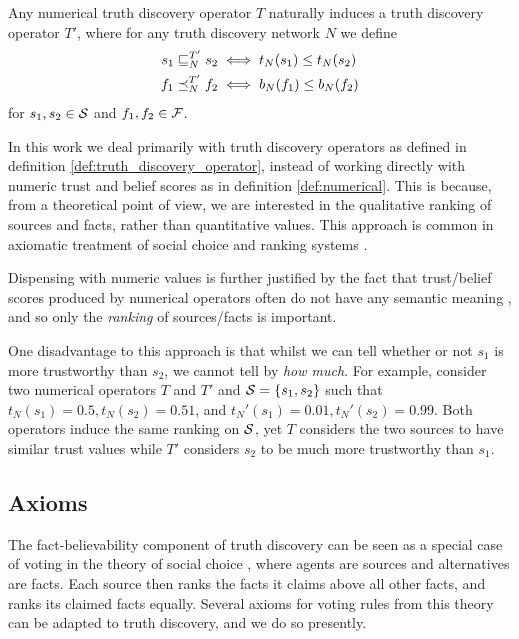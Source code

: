 \documentclass[../main.tex]{subfiles}
\begin{document}
\begin{remark}
    Any numerical truth discovery operator $T$ naturally induces a
    truth discovery operator $T'$, where for any truth discovery network $N$
    we define
    \begin{align*}
    s_1 \sle_N^{T'} s_2 & \iff t_N(s_1) \le t_N(s_2) \\
    f_1 \fle_N^{T'} f_2 & \iff b_N(f_1) \le b_N(f_2)
    \end{align*}
    for $s_1, s_2 \in \S$ and $f_1, f_2 \in \F$.
\end{remark}

In this work we deal primarily with truth discovery operators as defined in
definition \ref{def:truth_discovery_operator}, instead of working directly with
numeric trust and belief scores as in definition \ref{def:numerical}. This is
because, from a theoretical point of view, we are interested in the qualitative
ranking of sources and facts, rather than quantitative values. This approach is
common in axiomatic treatment of social choice and ranking systems
\cite{arrow,altman,altman_personalised}.

Dispensing with numeric values is further justified by the fact that
trust/belief scores produced by numerical operators often do not have any
semantic meaning \cite{pasternack}, and so only the \emph{ranking} of
sources/facts is important.

One disadvantage to this approach is that whilst we can tell whether or not
$s_1$ is more trustworthy than $s_2$, we cannot tell by \emph{how much}. For
example, consider two numerical operators $T$ and $T'$ and $\S=\{s_1, s_2\}$
such that $t_N(s_1)=0.5, t_N(s_2)=0.51$, and $t_N'(s_1)=0.01, t_N'(s_2)=0.99$.
Both operators induce the same ranking on $\S$, yet $T$ considers the two
sources to have similar trust values while $T'$ considers $s_2$ to be much more
trustworthy than $s_1$.

\subsection{Axioms}
\label{sec:axioms}

The fact-believability component of truth discovery can be seen as a special
case of voting in the theory of social choice \cite{handbook_voting}, where
agents are sources and alternatives are facts. Each source then ranks the facts
it claims above all other facts, and ranks its claimed facts
equally\footnotemark. Several axioms for voting rules from this theory can be
adapted to truth discovery, and we do so presently.
\end{document}

